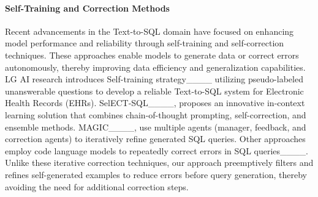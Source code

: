 \paragraph{Self-Training and Correction Methods}
Recent advancements in the Text-to-SQL domain have focused on enhancing model performance and reliability through self-training and self-correction techniques. These approaches enable models to generate data or correct errors autonomously, thereby improving data efficiency and generalization capabilities. LG AI research introduces Self-training strategy____ utilizing pseudo-labeled unanswerable questions to develop a reliable Text-to-SQL system for Electronic Health Records (EHRs). SelECT-SQL____, proposes an innovative in-context learning solution that combines chain-of-thought prompting, self-correction, and ensemble methods. MAGIC____, use multiple agents (manager, feedback, and correction agents) to iteratively refine generated SQL queries. Other approaches employ code language models to repeatedly correct errors in SQL queries____. Unlike these iterative correction techniques, our approach preemptively filters and refines self-generated examples to reduce errors before query generation, thereby avoiding the need for additional correction steps.
